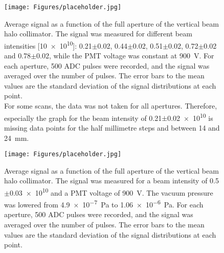 \begin{figure}
\centering
\texttt{[image: Figures/placeholder.jpg]}%
\caption[RHUL Cherenkov detector signal vs. collimator aperture: different beam intensities]{Average signal as a function of the full aperture of the vertical beam halo collimator. The signal was measured for different beam intensities [\num{10e10}]: 0.21$\pm$0.02, 0.44$\pm$0.02, 0.51$\pm$0.02, 0.72$\pm$0.02 and 0.78$\pm$0.02, while the PMT voltage was constant at \SI{900}{\volt}. For each aperture, 500 ADC pulses were recorded, and the signal was averaged over the number of pulses. The error bars to the mean values are the standard deviation of the signal distributions at each point.\\For some scans, the data was not taken for all apertures. Therefore, especially the graph for the beam intensity of \num{0.21}$\pm$\num{0.02e10} is missing data points for the half millimetre steps and between 14 and \SI{24}{\milli\metre}.}
\label{fig:AverageSignal_Aperture_BeamIntensities}
\end{figure}
\begin{figure}
\centering
\texttt{[image: Figures/placeholder.jpg]}%
\caption[RHUL Cherenkov detector signal vs. collimator aperture: different vacuum pressures]{Average signal as a function of the full aperture of the vertical beam halo collimator. The signal was measured for a beam intensity of \num{0.5}$\pm$\num{0.03e10} and a PMT voltage of \SI{900}{\volt}. The vacuum pressure was lowered from \SI{4.9e-7}{\pascal} to \SI{1.06e-6}{\pascal}. For each aperture, 500 ADC pulses were recorded, and the signal was averaged over the number of pulses. The error bars to the mean values are the standard deviation of the signal distributions at each point.}
\label{fig:AverageSignal_Aperture_VacuumPressures}
\end{figure}

